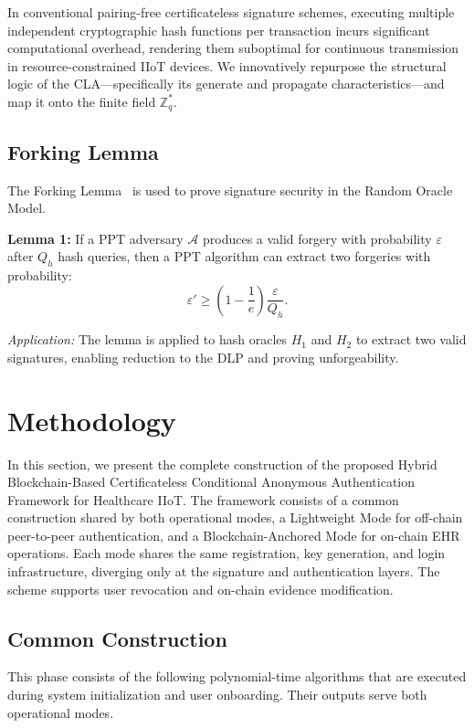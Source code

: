\documentclass[conference]{IEEEtran}
\begin{document}
In conventional pairing-free certificateless signature schemes, executing multiple independent cryptographic hash functions per transaction incurs significant computational overhead, rendering them suboptimal for continuous transmission in resource-constrained IIoT devices. We innovatively repurpose the structural logic of the CLA—specifically its generate and propagate characteristics—and map it onto the finite field $\mathbb{Z}^*_q$.



\subsection{Forking Lemma}

The Forking Lemma~ is used to prove signature security in the Random Oracle Model.

\textbf{Lemma 1:} If a PPT adversary $\mathcal{A}$ produces a valid forgery with probability $\varepsilon$ after $Q_h$ hash queries, then a PPT algorithm can extract two forgeries with probability:
\begin{equation}
\varepsilon' \geq \left(1 - \frac{1}{e}\right)\frac{\varepsilon}{Q_h}.
\end{equation}

\textit{Application:} The lemma is applied to hash oracles $H_1$ and $H_2$ to extract two valid signatures, enabling reduction to the DLP and proving unforgeability.

\section{Methodology}

In this section, we present the complete construction of the proposed Hybrid Blockchain-Based Certificateless Conditional Anonymous Authentication Framework for Healthcare IIoT. The framework consists of a common construction shared by both operational modes, a Lightweight Mode for off-chain peer-to-peer authentication, and a Blockchain-Anchored Mode for on-chain EHR operations. Each mode shares the same registration, key generation, and login infrastructure, diverging only at the signature and authentication layers. The scheme supports user revocation and on-chain evidence modification.

\subsection{Common Construction}

This phase consists of the following polynomial-time algorithms that are executed during system initialization and user onboarding. Their outputs serve both operational modes.
\end{document}
